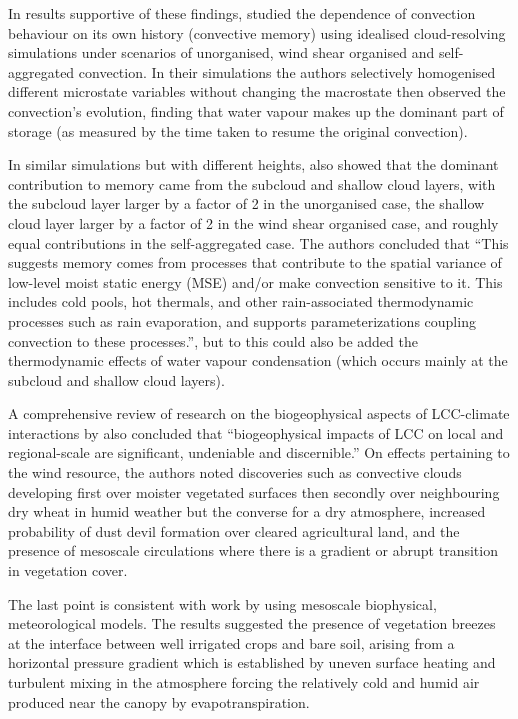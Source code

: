 In results supportive of these findings, \citet{colin2019} studied the dependence of convection behaviour on its own history (convective memory) using idealised cloud-resolving simulations under scenarios of unorganised, wind shear organised and self-aggregated convection. In their simulations the authors selectively homogenised different microstate variables without changing the macrostate then observed the convection’s evolution, finding that water vapour makes up the dominant part of storage (as measured by the time taken to resume the original convection).

In similar simulations but with different heights, \citet{colin2019} also showed that the dominant contribution to memory came from the subcloud and shallow cloud layers, with the subcloud layer larger by a factor of 2 in the unorganised case, the shallow cloud layer larger by a factor of 2 in the wind shear organised case, and roughly equal contributions in the self-aggregated case. The authors concluded that “This suggests memory comes from processes that contribute to the spatial variance of low-level moist static energy (MSE) and/or make convection sensitive to it. This includes cold pools, hot thermals, and other rain-associated thermodynamic processes such as rain evaporation, and supports parameterizations coupling convection to these processes.”, but to this could also be added the thermodynamic effects of water vapour condensation (which occurs mainly at the subcloud and shallow cloud layers).

A comprehensive review of research on the biogeophysical aspects of \ac{LCC}-climate interactions by \citet{mahmood2014} also concluded that “biogeophysical impacts of \ac{LCC} on local and regional-scale are significant, undeniable and discernible.” On effects pertaining to the wind resource, the authors noted discoveries such as convective clouds developing first over moister vegetated surfaces then secondly over neighbouring dry wheat in humid weather but the converse for a dry atmosphere, increased probability of dust devil formation over cleared agricultural land, and the presence of mesoscale circulations where there is a gradient or abrupt transition in vegetation cover.

The last point is consistent with work by \citet{hong1995, zhuojia1995} using mesoscale biophysical, meteorological models. The results suggested the presence of vegetation breezes at the interface between well irrigated crops and bare soil, arising from a horizontal pressure gradient which is established by uneven surface heating and turbulent mixing in the atmosphere forcing the relatively cold and humid air produced near the canopy by evapotranspiration.

